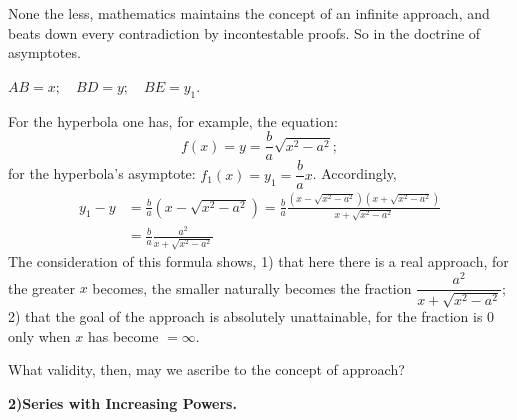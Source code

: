 \documentclass[12pt]{book}
\begin{document}
None the less, mathematics maintains the concept of an infinite approach, and beats
down every contradiction by incontestable proofs. So in the doctrine of asymptotes.

\begin{center}

$AB = x;\quad BD = y;\quad BE = y_1.$
\end{center}

For the hyperbola one has, for example, the equation:
\[
f(x) = y = \frac{b}{a}\sqrt{x^{2} - a^{2}};
\]
for the hyperbola's asymptote:
$f_1(x) = y_1 = \dfrac{b}{a}x$. Accordingly,
\[
\begin{aligned}
y_1 - y &= \frac{b}{a}\left(x - \sqrt{x^{2}-a^{2}}\right)
= \frac{b}{a}
   \frac{\left(x-\sqrt{x^{2}-a^{2}}\right)\left(x+\sqrt{x^{2}-a^{2}}\right)}
        {x+\sqrt{x^{2}-a^{2}}}\\
&= \frac{b}{a}\frac{a^{2}}{x+\sqrt{x^{2}-a^{2}}}
\end{aligned}
\]
The consideration of this formula shows, 1) that here there is a real approach, for
the greater $x$ becomes, the smaller naturally becomes the fraction
$\dfrac{a^{2}}{x+\sqrt{x^{2}-a^{2}}}$; 2) that the goal of the approach is
absolutely unattainable, for the fraction is $0$ only when $x$ has become
$= \infty$.

What validity, then, may we ascribe to the concept of approach?

\begin{center}
  {\bfseries 2)\quad Series with Increasing Powers.}
\end{center}
{}
\end{document}
